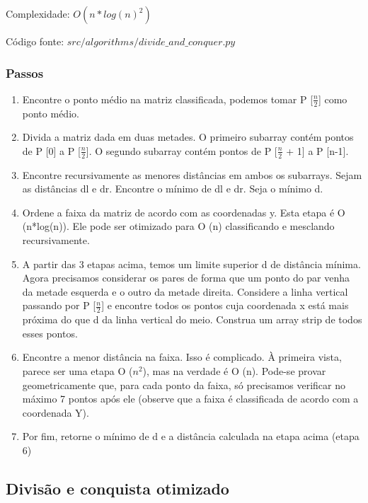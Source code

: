 \documentclass[10pt,a4paper]{article}
\begin{document}
    Complexidade: $O(n*log(n)^{2})$

    Código fonte: $src/algorithms/divide\_and\_conquer.py$

    \subsubsection{Passos}

    \begin{enumerate}
        \item Encontre o ponto médio na matriz classificada, podemos tomar P [$\frac{n}{2}$] como ponto médio. 
        \item Divida a matriz dada em duas metades. O primeiro subarray contém pontos de P [0] a P [$\frac{n}{2}$].
        O segundo subarray contém pontos de P [$\frac{n}{2}$ + 1] a P [n-1].
        \item Encontre recursivamente as menores distâncias em ambos os subarrays.
        Sejam as distâncias dl e dr. Encontre o mínimo de dl e dr. Seja o mínimo d.
        \item Ordene a faixa da matriz de acordo com as coordenadas y. Esta etapa é O (n*log(n)).
        Ele pode ser otimizado para O (n) classificando e mesclando recursivamente.
        \item A partir das 3 etapas acima, temos um limite superior d de distância mínima.
        Agora precisamos considerar os pares de forma que um ponto do par venha da metade esquerda
        e o outro da metade direita. Considere a linha vertical passando por P [$\frac{n}{2}$] 
        e encontre todos os pontos cuja coordenada x está mais próxima do que d da linha vertical do meio.
        Construa um array strip de todos esses pontos.
        \item Encontre a menor distância na faixa. Isso é complicado. À primeira vista, parece ser uma etapa O ($n^{2}$),
        mas na verdade é O (n). Pode-se provar geometricamente que, para cada ponto da faixa, só precisamos verificar no máximo 7
        pontos após ele (observe que a faixa é classificada de acordo com a coordenada Y).
        \item Por fim, retorne o mínimo de d e a distância calculada na etapa acima (etapa 6)
    \end{enumerate}
	
    \newpage

    \subsection{Divisão e conquista otimizado}
\end{document}
